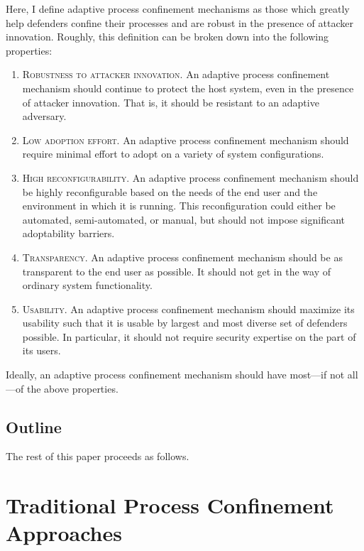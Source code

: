 \documentclass[dvipsnames, 12pt]{article}
\begin{document}
Here, I define adaptive process confinement mechanisms as those which greatly
help defenders confine their processes and are robust in the presence of
attacker innovation. Roughly, this definition can be broken down into the
following properties:
\begin{enumerate}[label=\bfseries P\arabic*., ref=P\arabic*, labelindent=2em]
    \item \label{p:1} \textsc{Robustness to attacker innovation.} An adaptive
    process confinement mechanism should continue to protect the host system,
    even in the presence of attacker innovation. That is, it should be resistant
    to an adaptive adversary.

    \item \label{p:2} \textsc{Low adoption effort.} An adaptive process
    confinement mechanism should require minimal effort to adopt on a variety of
    system configurations.

    \item \label{p:3} \textsc{High reconfigurability.} An adaptive process
    confinement mechanism should be highly reconfigurable based on the needs of
    the end user and the environment in which it is running. This
    reconfiguration could either be automated, semi-automated, or manual, but
    should not impose significant adoptability barriers.

    \item \label{p:4} \textsc{Transparency.} An adaptive process confinement
    mechanism should be as transparent to the end user as possible. It should
    not get in the way of ordinary system functionality.

    \item \label{p:5} \textsc{Usability.} An adaptive process confinement
    mechanism should maximize its usability such that it is usable by largest
    and most diverse set of defenders possible. In particular, it should not
    require security expertise on the part of its users.
\end{enumerate}
Ideally, an adaptive process confinement mechanism should have most---if not
all---of the above properties.

\subsection{Outline}

The rest of this paper proceeds as follows. 

\section{Traditional Process Confinement Approaches}
\end{document}
